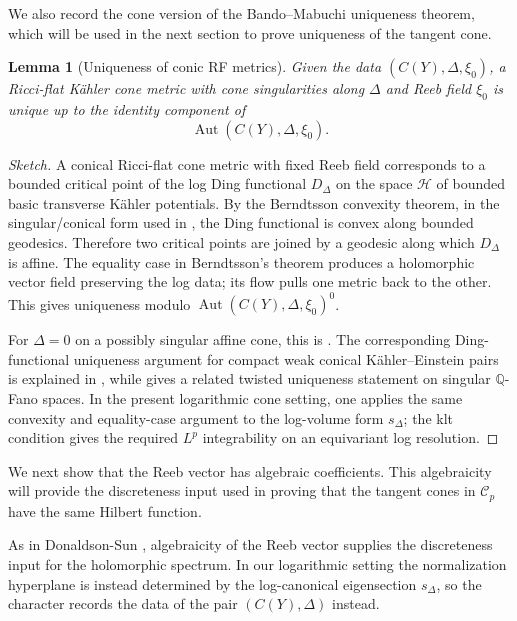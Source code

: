 \documentclass[11pt]{amsart}
\newtheorem{lemma}[theorem]{Lemma}
\theoremstyle{definition}
\theoremstyle{remark}
\begin{document}
We also record the cone version of the Bando--Mabuchi uniqueness theorem,
which will be used in the next section to prove uniqueness of the tangent cone.

\begin{lemma}[Uniqueness of conic RF metrics]
Given the data $(C(Y),\Delta,\xi_0)$, a Ricci-flat K\"ahler cone metric with cone
singularities along $\Delta$ and Reeb field $\xi_0$ is unique up to the identity
component of
\[
        \operatorname{Aut}(C(Y),\Delta,\xi_0).
\]
\end{lemma}

\begin{proof}[Sketch]
A conical Ricci-flat cone metric with fixed Reeb field
corresponds to a bounded critical point of the log Ding functional
$D_\Delta$ on the space $\mathcal H$ of bounded basic transverse K\"ahler
potentials. By the Berndtsson convexity theorem, in the singular/conical form
used in \cite[Appendix 1]{CDSIII}, the Ding functional is convex along bounded
geodesics. Therefore two critical points are joined by a geodesic along which
$D_\Delta$ is affine. The equality case in Berndtsson's theorem produces a
holomorphic vector field preserving the log data; its flow pulls one metric back
to the other. This gives uniqueness modulo
$\operatorname{Aut}(C(Y),\Delta,\xi_0)^0$.

For $\Delta=0$ on a possibly singular affine cone, this is
\cite[Proposition~4.8]{DSII}. The corresponding Ding-functional uniqueness
argument for compact weak conical K\"ahler--Einstein pairs is explained in
\cite[Appendix~1]{CDSIII}, while \cite[Proposition~5]{DatarSzekelyhidi} gives a
related twisted uniqueness statement on singular $\mathbb Q$-Fano spaces. In
the present logarithmic cone setting, one applies the same convexity and
equality-case argument to the log-volume form $s_\Delta$; the klt condition gives
the required $L^p$ integrability on an equivariant log resolution.
\end{proof}

We next show that the Reeb vector has algebraic coefficients. This algebraicity
will provide the discreteness input used in proving that the tangent cones in
$\mathcal C_p$ have the same Hilbert function.

As in Donaldson-Sun \cite[Proposition~2.21]{DSII}, algebraicity of the Reeb
vector supplies the discreteness input for the holomorphic spectrum. In our
logarithmic setting the normalization hyperplane is instead determined by the
log-canonical eigensection $s_\Delta$, so the character records the data of the
pair $(C(Y),\Delta)$ instead.
\end{document}
